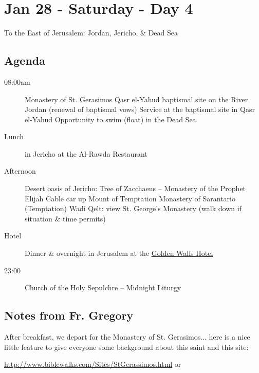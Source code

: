 \documentclass[letterpaper]{report}
\begin{document}

\clearpage

\clearpage
\section{Jan 28 - Saturday - Day 4}
To the East of Jerusalem: Jordan, Jericho, \& Dead Sea

\subsection{Agenda}
\begin{description}
	\item[08:00am]  Monastery of St. Gerasimos
	  \subitem Qasr el-Yahud baptismal site on the River Jordan
	    (renewal of baptismal vows)
	  \subitem Service at the baptismal site in Qasr el-Yahud
	  \subitem Opportunity to swim (float) in the Dead Sea
	\item[Lunch] in Jericho at the Al-Rawda Restaurant 
	\item[Afternoon] Desert oasis of Jericho: Tree of Zacchaeus – Monastery of the Prophet Elijah
	  \subitem Cable car up Mount of Temptation
	  \subitem Monastery of Sarantario (Temptation)
	  \subitem Wadi Qelt: view St. George's Monastery (walk down if situation \& time permits) 
	\item[Hotel] Dinner \& overnight in Jerusalem at the
	  \href{http://goldenwalls.com/}{Golden Walls Hotel}
	\item[23:00]  Church of the Holy Sepulchre – Midnight Liturgy
\end{description}

\subsection{Notes from Fr. Gregory}
After breakfast, we depart for the Monastery of St. Gerasimos...
here is a nice little feature to give everyone some background about this
saint and this site:

\url{http://www.biblewalks.com/Sites/StGerassimos.html}
or
\end{document}
